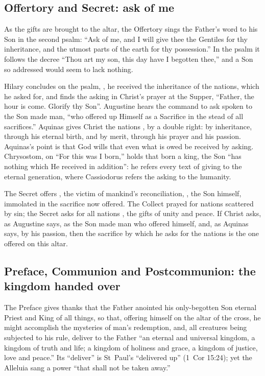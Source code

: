 \subsection{Offertory and Secret: ask of me}

As the gifts are brought to the altar, the Offertory sings the Father's word
to his Son in the second psalm: ``Ask of me, and I will give thee the Gentiles
for thy inheritance, and the utmost parts of the earth for thy possession.''
In the psalm it follows the decree ``Thou art my son, this day have I begotten
thee,'' and a Son so addressed would seem to lack nothing.

Hilary concludes on the psalm, , he received the inheritance of the nations, which he asked for, and
finds the asking in Christ's prayer at the Supper, ``Father, the hour is come.
Glorify thy Son''.
Augustine hears the command to ask spoken to the Son made man, ``who offered
up Himself as a Sacrifice in the stead of all sacrifices.'' Aquinas gives
Christ the nations , by a double right: by inheritance,
through his eternal birth, and by merit, through his prayer and his passion.
Aquinas's point is that God wills that even what is owed be received by
asking. Chrysostom, on ``For this was I born,'' holds that born a king, the
Son ``has nothing which He received in addition'': he refers every text of
giving to the eternal generation, where Cassiodorus refers the asking to the
humanity.

The Secret offers , the victim
of mankind's reconciliation, ,
the Son himself, immolated in the sacrifice now offered. The Collect prayed
for nations scattered by sin; the Secret asks for all nations , the gifts of unity and peace. If Christ asks, as Augustine
says, as the Son made man who offered himself, and, as Aquinas says, by his
passion, then the sacrifice by which he asks for the nations is the one
offered on this altar.

\subsection{Preface, Communion and Postcommunion: the kingdom handed over}

The Preface gives thanks that the Father anointed his only-begotten Son
eternal Priest and King of all things, so that, offering himself on the altar
of the cross, he might accomplish the mysteries of man's redemption, and, all
creatures being subjected to his rule, deliver to the Father ``an eternal and
universal kingdom, a kingdom of truth and life; a kingdom of holiness and
grace, a kingdom of justice, love and peace.'' Its ``deliver'' is St~Paul's
``delivered up'' (1~Cor 15:24); yet the Alleluia sang a power ``that shall
not be taken away.''

